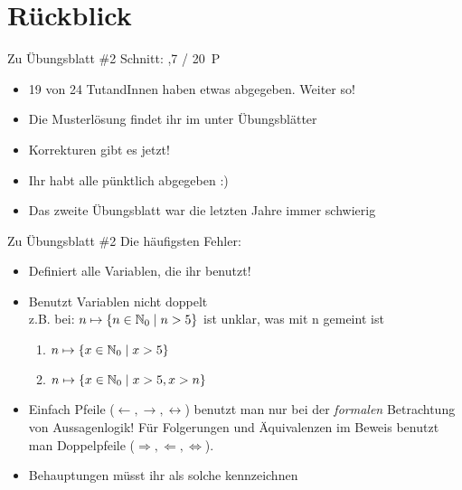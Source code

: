 
\newcommand{\handout}{}



\morescalingdelimiters



\section{Rückblick}

\begin{frame}{Zu Übungsblatt \#2}
	Schnitt: ,7 / 20~P

	\begin{itemize}[<+->]
		\item 19 von 24 TutandInnen haben etwas abgegeben. Weiter so!
		\item Die Musterlösung findet ihr im \ILIAS unter Übungsblätter
		\item Korrekturen gibt es jetzt!
		\item Ihr habt alle pünktlich abgegeben :)
		\item Das zweite Übungsblatt war die letzten Jahre immer schwierig
	\end{itemize}
\end{frame}

\begin{frame}{Zu Übungsblatt \#2}
	Die häufigsten Fehler:
	\begin{itemize}[<+->]
		\item Definiert alle Variablen, die ihr benutzt!
		\item Benutzt Variablen nicht doppelt \\
				z.B. bei: $n \mapsto \{n \in \mathbb{N}_0 \mid n > 5\}$ ist unklar, was mit n gemeint ist
		\implitem \begin{enumerate}
			\item $n \mapsto \{x \in \mathbb{N}_0 \mid x > 5\}$
			\item $n \mapsto \{x \in \mathbb{N}_0 \mid x > 5, x > n\}$
		\end{enumerate}
		\item Einfach Pfeile ($\leftarrow, \rightarrow, \leftrightarrow$) benutzt man nur bei der \textit{formalen} Betrachtung von Aussagenlogik!
		\implitem Für Folgerungen und Äquivalenzen im Beweis benutzt man Doppelpfeile ($\Rightarrow, \Leftarrow, \Leftrightarrow$).
		\item Behauptungen müsst ihr als solche kennzeichnen
	\end{itemize}
\end{frame}

